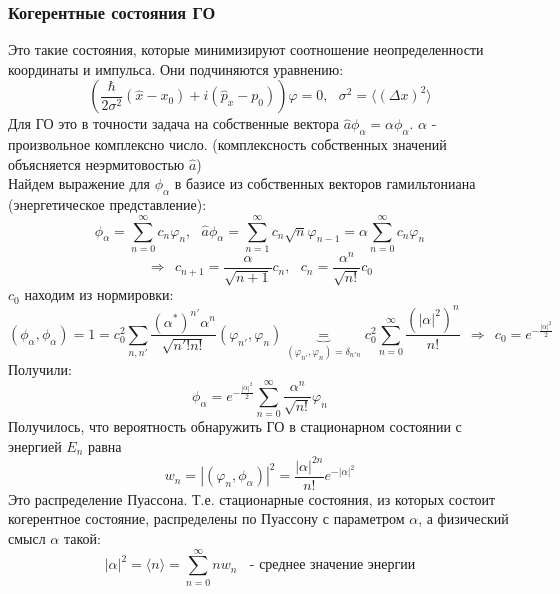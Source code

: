 		\subsubsection{Когерентные состояния ГО}
			Это такие состояния, которые минимизируют соотношение неопределенности координаты и импульса. Они подчиняются уравнению:
			$$
				\left(\frac{\hbar}{2\sigma^2}(\hat{x}-x_0) + i(\hat{p}_x-p_0)\right)\varphi = 0, \ \ \ \sigma^2 = \langle(\Delta x)^2\rangle
			$$
			Для ГО это в точности задача на собственные вектора $\hat{a}\phi_{\alpha} = \alpha\phi_{\alpha}$. $\alpha$ - произвольное комплексно число. (комплексность собственных значений объясняется неэрмитовостью $\hat{a}$) \\
			Найдем выражение для $\phi_{\alpha}$ в базисе из собственных векторов гамильтониана (энергетическое представление):
			$$
				\phi_{\alpha} = \sum\limits_{n = 0}^{\infty} c_n\varphi_n, \ \ \ \hat{a}\phi_{\alpha} = \sum\limits_{n = 1}^{\infty}c_n\sqrt{n}\varphi_{n-1}=\alpha\sum\limits_{n = 0}^{\infty}c_n\varphi_n
			$$
			$$
				\Rightarrow \ \ c_{n+1} = \frac{\alpha}{\sqrt{n+1}}c_n, \ \ \ c_n = \frac{\alpha^n}{\sqrt{n!}}c_0
			$$
			$c_0$ находим из нормировки:
			$$
				(\phi_{\alpha},\phi_{\alpha}) = 1 = c_0^2\sum\limits_{n,n'}\frac{(\alpha^{*})^{n'}\alpha^n}{\sqrt{n'!n!}}(\varphi_{n'},\varphi_n) \underbrace{=}_{(\varphi_{n'},\varphi_n)=\delta_{n'n}} c_0^2\sum\limits_{n = 0}^{\infty}\frac{(|\alpha|^2)^n}{n!} \ \ \Rightarrow \ \ c_0 = e^{-\frac{|\alpha|^2}{2}}
			$$
			Получили:
			$$
				\phi_{\alpha} = e^{-\frac{|\alpha|^2}{2}}\sum\limits_{n = 0}^{\infty}\frac{\alpha^n}{\sqrt{n!}}\varphi_n 
			$$
			Получилось, что вероятность обнаружить ГО в стационарном состоянии с энергией $E_n$ равна
			$$
				w_n = |(\varphi_n, \phi_{\alpha})|^2 = \frac{|\alpha|^{2n}}{n!}e^{-|\alpha|^2}
			$$
			Это распределение Пуассона. Т.е. стационарные состояния, из которых состоит когерентное состояние, распределены по Пуассону с параметром $\alpha$, а физический смысл 
			$\alpha$ такой:
			$$
				|\alpha|^2 = \langle n \rangle = \sum\limits_{n = 0}^{\infty}nw_n \ \ \ \ \text{- среднее значение энергии}
			$$